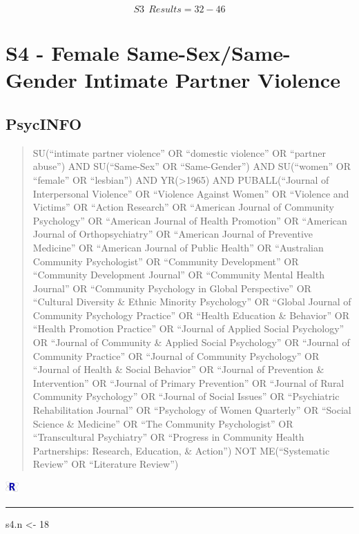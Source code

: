 \documentclass[]{tufte-handout}
\newenvironment{Shaded}{}{}
\newcommand{\DecValTok}[1]{{#1}}
\newcommand{\StringTok}[1]{{#1}}
\newcommand{\NormalTok}[1]{{#1}}
\newcommand{\Rrule}{
    \vspace*{1em}
    \noindent
    \hspace{-1em}
    \includegraphics[width=0.5cm]{auxDocs/Rlogo.png}
    \textcolor{Rblue}{
        \rule[0.1in]{0.90\linewidth}{0.02mm}
    }
    \vspace{-1.35em}
}
\begin{document}
\[ S3~~Results = 32-46 \]

\newpage

\section{S4 - Female Same-Sex/Same-Gender Intimate Partner
Violence}\label{s4---female-same-sexsame-gender-intimate-partner-violence}

\subsection{PsycINFO}\label{psycinfo-3}

\begin{quote}
SU(``intimate partner violence'' OR ``domestic violence'' OR ``partner
abuse'') AND SU(``Same-Sex'' OR ``Same-Gender'') AND SU(``women'' OR
``female'' OR ``lesbian'') AND YR(\textgreater{}1965) AND
PUBALL(``Journal of Interpersonal Violence'' OR ``Violence Against
Women'' OR ``Violence and Victims'' OR ``Action Research'' OR ``American
Journal of Community Psychology'' OR ``American Journal of Health
Promotion'' OR ``American Journal of Orthopsychiatry'' OR ``American
Journal of Preventive Medicine'' OR ``American Journal of Public
Health'' OR ``Australian Community Psychologist'' OR ``Community
Development'' OR ``Community Development Journal'' OR ``Community Mental
Health Journal'' OR ``Community Psychology in Global Perspective'' OR
``Cultural Diversity \& Ethnic Minority Psychology'' OR ``Global Journal
of Community Psychology Practice'' OR ``Health Education \& Behavior''
OR ``Health Promotion Practice'' OR ``Journal of Applied Social
Psychology'' OR ``Journal of Community \& Applied Social Psychology'' OR
``Journal of Community Practice'' OR ``Journal of Community Psychology''
OR ``Journal of Health \& Social Behavior'' OR ``Journal of Prevention
\& Intervention'' OR ``Journal of Primary Prevention'' OR ``Journal of
Rural Community Psychology'' OR ``Journal of Social Issues'' OR
``Psychiatric Rehabilitation Journal'' OR ``Psychology of Women
Quarterly'' OR ``Social Science \& Medicine'' OR ``The Community
Psychologist'' OR ``Transcultural Psychiatry'' OR ``Progress in
Community Health Partnerships: Research, Education, \& Action'') NOT
ME(``Systematic Review'' OR ``Literature Review'')
\end{quote}

\Rrule

\begin{Shaded}
\begin{Highlighting}[]
\NormalTok{s4.n <-}\StringTok{ }\DecValTok{18}
\end{Highlighting}
\end{Shaded}
\end{document}
